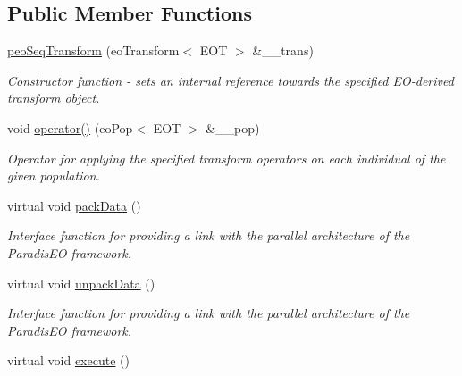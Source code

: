\subsection*{Public Member Functions}
\begin{CompactItemize}
\item 
\hyperlink{classpeoSeqTransform_3b8e4ed19d9458938eb669d83a53c626}{peo\-Seq\-Transform} (eo\-Transform$<$ EOT $>$ \&\_\-\_\-trans)
\begin{CompactList}\small\item\em Constructor function - sets an internal reference towards the specified EO-derived transform object. \item\end{CompactList}\item 
void \hyperlink{classpeoSeqTransform_1ba63536abb6c4e1c369e0b7e066872e}{operator()} (eo\-Pop$<$ EOT $>$ \&\_\-\_\-pop)
\begin{CompactList}\small\item\em Operator for applying the specified transform operators on each individual of the given population. \item\end{CompactList}\item 
\hypertarget{classpeoSeqTransform_c4bf2724e9f6055f12bd169fad893be3}{
virtual void \hyperlink{classpeoSeqTransform_c4bf2724e9f6055f12bd169fad893be3}{pack\-Data} ()}
\label{classpeoSeqTransform_c4bf2724e9f6055f12bd169fad893be3}

\begin{CompactList}\small\item\em Interface function for providing a link with the parallel architecture of the Paradis\-EO framework. \item\end{CompactList}\item 
\hypertarget{classpeoSeqTransform_24e6cf15ef230ed538031b522ddd4ae6}{
virtual void \hyperlink{classpeoSeqTransform_24e6cf15ef230ed538031b522ddd4ae6}{unpack\-Data} ()}
\label{classpeoSeqTransform_24e6cf15ef230ed538031b522ddd4ae6}

\begin{CompactList}\small\item\em Interface function for providing a link with the parallel architecture of the Paradis\-EO framework. \item\end{CompactList}\item 
\hypertarget{classpeoSeqTransform_0294a2f9d6b44ec74d22eaceccdffc2b}{
virtual void \hyperlink{classpeoSeqTransform_0294a2f9d6b44ec74d22eaceccdffc2b}{execute} ()}
\label{classpeoSeqTransform_0294a2f9d6b44ec74d22eaceccdffc2b}


\end{CompactItemize}
